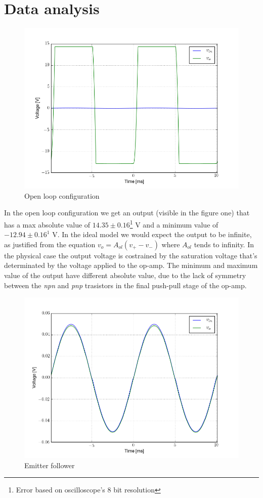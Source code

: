 \documentclass[oneside]{book}
\begin{document}
\section{Data analysis}
\begin{figure}[H]
\centering
\includegraphics[width=.7\textwidth]{img/scope1.png}
\caption{Open loop configuration}
\end{figure}
In the open loop configuration we get an output (visible in the figure one) that has a max absolute value of $14.35\pm 0.16$\footnote{Error based on oscilloscope's 8 bit resolution} V and a minimum value of $-12.94\pm 0.16^1$ V. In the ideal model we would expect the output to be infinite, as justified from the equation $v_o = A_{ol}(v_+-v_-)$ where $A_{ol}$ tends to infinity. In the physical case the output voltage is costrained by the saturation voltage that's determinated by the voltage applied to the op-amp.
The minimum and maximum value of the output have different absolute value, due to the lack of symmetry between the \emph{npn} and \emph{pnp} trasistors in the final push-pull stage of the op-amp. 
\begin{figure}[H]
\centering
\includegraphics[width=.7\textwidth]{img/scope2.png}
\caption{Emitter follower}
\end{figure}
\end{document}
